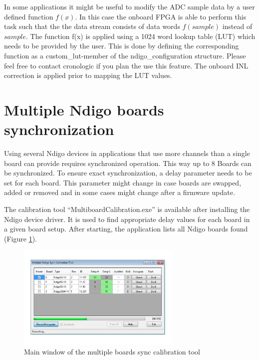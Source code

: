         In some applications it might be useful to modify the ADC sample data by a user defined function $f(x)$. In this case the onboard FPGA is able to perform this task such that the the data stream consists of data words $f(sample)$ instead of $sample$. The function f(x) is applied using a 1024 word lookup table (LUT) which needs to be provided by the user. This is done by defining the corresponding function as a custom\_lut-member of the ndigo\_configuration structure. Please feel free to contact cronologic if you plan the use this feature. The onboard INL correction is applied prior to mapping the LUT values.  
    
\section{Multiple Ndigo boards synchronization}
    Using several Ndigo devices in applications that use more channels than a single board can provide requires synchronized operation. This way up to 8 Boards can be synchronized. To ensure exact synchronization, a delay parameter needs to be set for each board. This parameter might change in case boards are swapped, added or removed and in some cases might change after a firmware update.\par
    
    The calibration tool ``MultiboardCalibration.exe'' is available after installing the Ndigo device driver. It is used to find appropriate delay values for each board in a given board setup. After starting, the application lists all Ndigo boards found (Figure \ref{fig:SyncCalibTool}).\par

    \begin{figure}[ht]
        \begin{center}
            \includegraphics[width=0.7\textwidth]{figures/SyncCalibTool.pdf}
            \caption{Main window of the multiple boards sync calibration tool\label{fig:SyncCalibTool}}
        \end{center}
    \end{figure}

